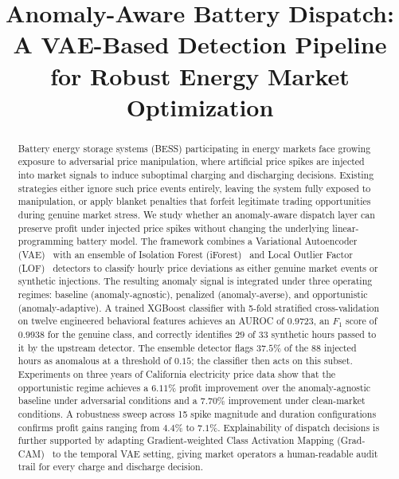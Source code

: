 \documentclass[journal]{IEEEtran}
\begin{document}
\title{Anomaly-Aware Battery Dispatch: A VAE-Based Detection Pipeline for Robust Energy Market Optimization}

\author{
}
\maketitle

\begin{abstract}
Battery energy storage systems (BESS) participating in energy markets face growing exposure to adversarial price manipulation, where artificial price spikes are injected into market signals to induce suboptimal charging and discharging decisions. Existing strategies either ignore such price events entirely, leaving the system fully exposed to manipulation, or apply blanket penalties that forfeit legitimate trading opportunities during genuine market stress. We study whether an anomaly-aware dispatch layer can preserve profit under injected price spikes without changing the underlying linear-programming battery model. The framework combines a Variational Autoencoder (VAE)~\cite{VAE} with an ensemble of Isolation Forest (iForest)~\cite{IForest} and Local Outlier Factor (LOF)~\cite{LOF} detectors to classify hourly price deviations as either genuine market events or synthetic injections. The resulting anomaly signal is integrated under three operating regimes: baseline (anomaly-agnostic), penalized (anomaly-averse), and opportunistic (anomaly-adaptive). A trained XGBoost classifier with 5-fold stratified cross-validation on twelve engineered behavioral features achieves an AUROC of $0.9723$, an $F_1$ score of $0.9938$ for the genuine class, and correctly identifies $29$ of $33$ synthetic hours passed to it by the upstream detector. The ensemble detector flags $37.5\%$ of the $88$ injected hours as anomalous at a threshold of $0.15$; the classifier then acts on this subset. Experiments on three years of California electricity price data show that the opportunistic regime achieves a $6.11\%$ profit improvement over the anomaly-agnostic baseline under adversarial conditions and a $7.70\%$ improvement under clean-market conditions. A robustness sweep across 15 spike magnitude and duration configurations confirms profit gains ranging from $4.4\%$ to $7.1\%$. Explainability of dispatch decisions is further supported by adapting Gradient-weighted Class Activation Mapping (Grad-CAM)~\cite{GradCAM} to the temporal VAE setting, giving market operators a human-readable audit trail for every charge and discharge decision.
\end{abstract}
\end{document}
